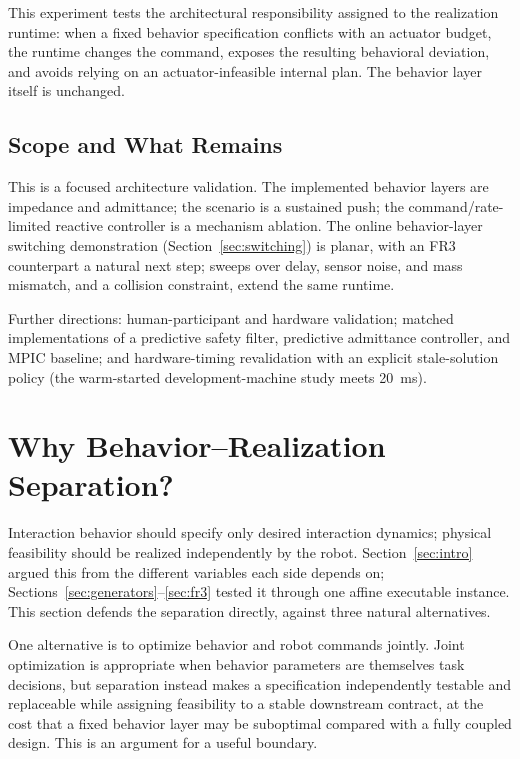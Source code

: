 \documentclass[journal]{IEEEtran}
\begin{document}
This experiment tests the architectural responsibility assigned to the
realization runtime: when a fixed behavior specification conflicts with
an actuator budget, the runtime changes the command, exposes the
resulting behavioral deviation, and avoids relying on an
actuator-infeasible internal plan. The behavior layer itself is
unchanged.

\subsection{Scope and What Remains}
\label{sec:scope}

This is a focused architecture validation. The implemented behavior
layers are impedance and admittance; the scenario is a sustained push;
the command/rate-limited reactive controller is a mechanism ablation.
The online behavior-layer switching demonstration
(Section~\ref{sec:switching}) is planar, with an FR3 counterpart a
natural next step; sweeps over delay, sensor noise, and mass mismatch,
and a collision constraint, extend the same runtime.

Further directions: human-participant and hardware validation; matched
implementations of a predictive safety filter, predictive admittance
controller, and MPIC baseline; and hardware-timing revalidation with an
explicit stale-solution policy (the warm-started development-machine
study meets 20~ms).

\section{Why Behavior--Realization Separation?}
\label{sec:why}

Interaction behavior should specify only desired interaction dynamics;
physical feasibility should be realized independently by the robot.
Section~\ref{sec:intro} argued this from the different variables each side depends on;
Sections~\ref{sec:generators}--\ref{sec:fr3} tested it through one affine
executable instance. This section defends the separation directly,
against three natural alternatives.

One alternative is to optimize behavior and robot commands jointly.
Joint optimization is appropriate when behavior parameters are
themselves task decisions, but separation instead makes a specification
independently testable and replaceable while assigning feasibility to a
stable downstream contract, at the cost that a fixed behavior layer may
be suboptimal compared with a fully coupled design. This is an argument
for a useful boundary.
\end{document}
